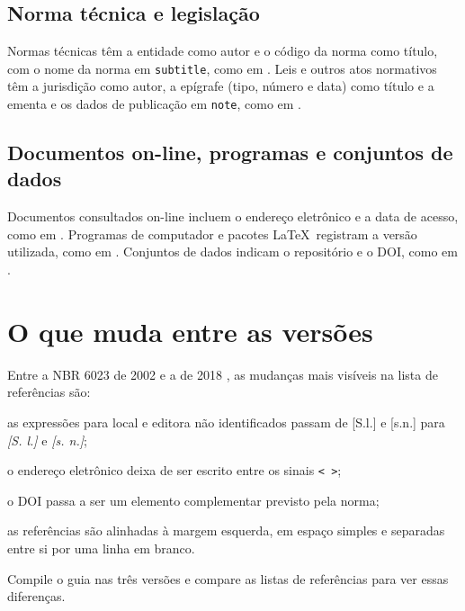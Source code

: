 \subsection{Norma técnica e legislação}

Normas técnicas têm a entidade como autor e o código da norma como título, com o nome da norma em \texttt{subtitle}, como em . Leis e outros atos normativos têm a jurisdição como autor, a epígrafe (tipo, número e data) como título e a ementa e os dados de publicação em \texttt{note}, como em .

\subsection{Documentos on-line, programas e conjuntos de dados}

Documentos consultados on-line incluem o endereço eletrônico e a data de acesso, como em . Programas de computador e pacotes \LaTeX\ registram a versão utilizada, como em . Conjuntos de dados indicam o repositório e o DOI, como em .

\section{O que muda entre as versões}\label{sec:mudancas-referencias}

Entre a NBR 6023 de 2002 \cite{abnt6023-2002} e a de 2018 \cite{abnt6023}, as mudanças mais visíveis na lista de referências são:

\begin{alineas}
	\item as expressões para local e editora não identificados passam de [S.l.] e [s.n.] para \textit{[S. l.]} e \textit{[s. n.]};
	\item o endereço eletrônico deixa de ser escrito entre os sinais \texttt{< >};
	\item o DOI passa a ser um elemento complementar previsto pela norma;
	\item as referências são alinhadas à margem esquerda, em espaço simples e separadas entre si por uma linha em branco.
\end{alineas}

Compile o guia nas três versões e compare as listas de referências para ver essas diferenças.
